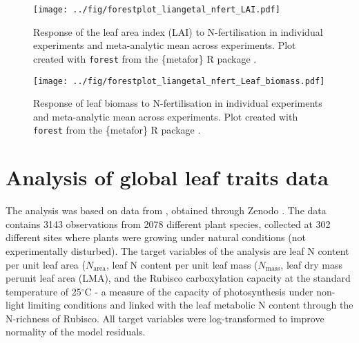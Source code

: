 \documentclass{myreport}
\begin{document}
\begin{figure}[h]
\centering
\texttt{[image: ../fig/forestplot\_liangetal\_nfert\_LAI.pdf]}
\caption{Response of the leaf area index (LAI) to N-fertilisation in individual experiments and meta-analytic mean across experiments. Plot created with \texttt{forest} from the \{metafor\} R package \cite{viechtbauer_conducting_2010}.}
\end{figure}

\begin{figure}[h]
\centering
\texttt{[image: ../fig/forestplot\_liangetal\_nfert\_Leaf\_biomass.pdf]}
\caption{Response of leaf biomass to N-fertilisation in individual experiments and meta-analytic mean across experiments. Plot created with \texttt{forest} from the \{metafor\} R package \cite{viechtbauer_conducting_2010}.}
\end{figure}

\clearpage

% 
% 


\section{Analysis of global leaf traits data}

The analysis was based on data from \citet{dong22jecol}, obtained through Zenodo \citep{dong22zenodo}. The data contains 3143 observations from 2078 different plant species, collected at 302 different sites where plants were growing under natural conditions (not experimentally disturbed). The target variables of the analysis are leaf N content per unit leaf area ($N_\text{area}$, leaf N content per unit leaf mass ($N_\text{mass}$, leaf dry mass perunit leaf area (LMA), and the Rubisco carboxylation capacity at the standard temperature of 25$^\circ$C - a measure of the capacity of photosynthesis under non-light limiting conditions and linked with the leaf metabolic N content through the N-richness of Rubisco. All target variables were log-transformed to improve normality of the model residuals. 
\end{document}
